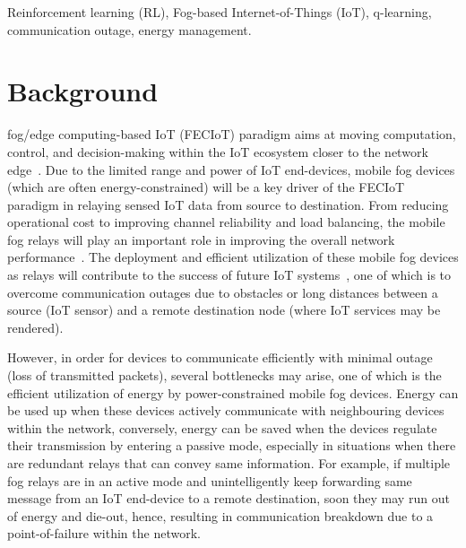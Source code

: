 \documentclass[journal]{IEEEtran}
\begin{document}
\begin{IEEEkeywords}
Reinforcement learning (RL), Fog-based Internet-of-Things (IoT), q-learning, communication outage, energy management.
\end{IEEEkeywords}


%
\IEEEpeerreviewmaketitle

\section{Background}
 fog/edge computing-based IoT (FECIoT) paradigm aims at moving computation, control, and decision-making within the IoT ecosystem closer to the network edge~\cite{Omoniwa2018}. Due to the limited range and power of IoT end-devices, mobile fog devices (which are often energy-constrained) will be a key driver of the FECIoT paradigm in relaying sensed IoT data from source to destination. From reducing operational cost to improving channel reliability and load balancing, the mobile fog relays will play an important role in improving the overall network performance~\cite{BenMimoune2017}. The deployment and efficient utilization of these mobile fog devices as relays will contribute to the success of future IoT systems~\cite{Chiangh2016}, one of which is to overcome communication outages due to obstacles or long distances between a source (IoT sensor) and a remote destination node (where IoT services may be rendered).

However, in order for devices to communicate efficiently with minimal outage (loss of transmitted packets), several bottlenecks may arise, one of which is the efficient utilization of energy by power-constrained mobile fog devices. Energy can be used up when these devices actively communicate with neighbouring devices within the network, conversely, energy can be saved when the devices regulate their transmission by entering a passive mode, especially in situations when there are redundant relays that can convey same information. For example, if multiple fog relays are in an active mode and unintelligently keep forwarding same message from an IoT end-device to a remote destination, soon they may run out of energy and die-out, hence, resulting in communication breakdown due to a point-of-failure within the network.
\end{document}
